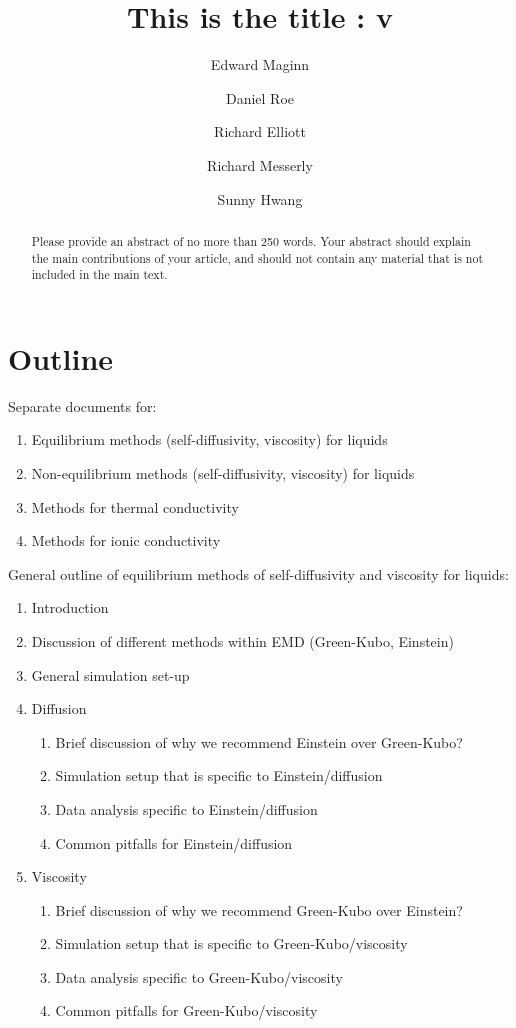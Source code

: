 \documentclass[9pt]{livecoms}
\title{This is the title : v\versionnumber}
\author[1*,\authfn{1}\authfn{3}]{Edward Maginn}
\author[2\authfn{1}\authfn{4}]{Daniel Roe}
\author[3\authfn{1}\authfn{4}]{Richard Elliott}
\author[4\authfn{1}\authfn{4}]{Richard Messerly}
\author[5\authfn{1}\authfn{4}]{Sunny Hwang}
\affil[1]{Institution 1}
\affil[2]{Institution 2}
\begin{document}
\maketitle

\begin{abstract}
Please provide an abstract of no more than 250 words. Your abstract should explain the main contributions of your article, and should not contain any material that is not included in the main text.
\end{abstract}



\section{Outline}

Separate documents for:
\begin{enumerate}
	\item Equilibrium methods (self-diffusivity, viscosity) for liquids
	\item Non-equilibrium methods (self-diffusivity, viscosity) for liquids
	\item Methods for thermal conductivity
	\item Methods for ionic conductivity
\end{enumerate}

General outline of equilibrium methods of self-diffusivity and viscosity for liquids:
\begin{enumerate}
	\item Introduction
	\item Discussion of different methods within EMD (Green-Kubo, Einstein)
	\item General simulation set-up
	\item Diffusion
	\begin{enumerate}
		\item Brief discussion of why we recommend Einstein over Green-Kubo?
		\item Simulation setup that is specific to Einstein/diffusion
		\item Data analysis specific to Einstein/diffusion
		\item Common pitfalls for Einstein/diffusion
	\end{enumerate}
	\item Viscosity
	\begin{enumerate}
		\item Brief discussion of why we recommend Green-Kubo over Einstein?
		\item Simulation setup that is specific to Green-Kubo/viscosity
		\item Data analysis specific to Green-Kubo/viscosity
		\item Common pitfalls for Green-Kubo/viscosity
	\end{enumerate}
\end{enumerate}
\end{document}
